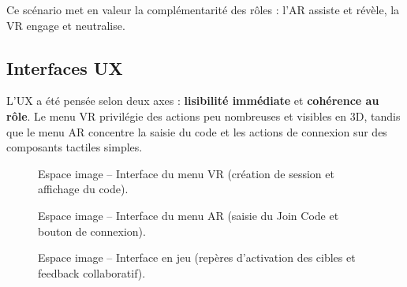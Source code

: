 \documentclass[12pt, a4paper]{article}
\begin{document}
Ce scénario met en valeur la complémentarité des rôles : l'AR assiste et révèle, la VR engage et neutralise.

\subsection{Interfaces UX}

L'UX a été pensée selon deux axes : \textbf{lisibilité immédiate} et \textbf{cohérence au rôle}. Le menu VR privilégie des actions peu nombreuses et visibles en 3D, tandis que le menu AR concentre la saisie du code et les actions de connexion sur des composants tactiles simples.

\begin{figure}[H]
  \centering
  \fbox{\rule{0pt}{6cm}\rule{0.92\linewidth}{0pt}}
  \caption{Espace image -- Interface du menu VR (création de session et affichage du code).}
  \label{fig:ux-vr-menu}
\end{figure}

\begin{figure}[H]
  \centering
  \fbox{\rule{0pt}{6cm}\rule{0.92\linewidth}{0pt}}
  \caption{Espace image -- Interface du menu AR (saisie du Join Code et bouton de connexion).}
  \label{fig:ux-ar-menu}
\end{figure}

\begin{figure}[H]
  \centering
  \fbox{\rule{0pt}{6cm}\rule{0.92\linewidth}{0pt}}
  \caption{Espace image -- Interface en jeu (repères d'activation des cibles et feedback collaboratif).}
  \label{fig:ux-ingame}
\end{figure}
\end{document}
